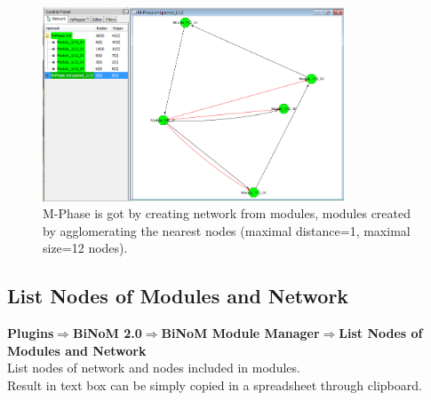 \begin{figure}
\centering
\includegraphics[width=0.8\textwidth]{graphics/M-Phase_packed}
\caption{M-Phase is got by creating network from modules, modules created by agglomerating the nearest nodes (maximal distance=1, maximal size=12 nodes).}
\label{M-Phase_packed}
\end{figure}

\subsection{List Nodes of Modules and Network}
\textbf{Plugins$\Rightarrow$BiNoM 2.0$\Rightarrow$BiNoM Module Manager$\Rightarrow$List Nodes of Modules and Network}\\
List nodes of network and nodes included in modules.\\
Result in text box can be simply copied in a spreadsheet through clipboard.

